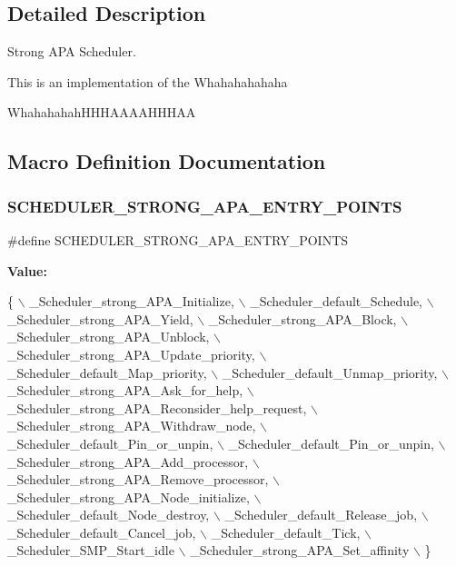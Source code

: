 \subsection{Detailed Description}
Strong A\+PA Scheduler. 

This is an implementation of the Whahahahahaha

Whahahahah\+H\+H\+H\+A\+A\+A\+A\+H\+H\+H\+AA 

\subsection{Macro Definition Documentation}
\mbox{\label{group__RTEMSScoreSchedulerStrongAPA_ga98b37281082c0be47dc489eed554c5cc}} 
\subsubsection{\texorpdfstring{S\+C\+H\+E\+D\+U\+L\+E\+R\+\_\+\+S\+T\+R\+O\+N\+G\+\_\+\+A\+P\+A\+\_\+\+E\+N\+T\+R\+Y\+\_\+\+P\+O\+I\+N\+TS}{SCHEDULER\_STRONG\_APA\_ENTRY\_POINTS}}
{\footnotesize\ttfamily \#define S\+C\+H\+E\+D\+U\+L\+E\+R\+\_\+\+S\+T\+R\+O\+N\+G\+\_\+\+A\+P\+A\+\_\+\+E\+N\+T\+R\+Y\+\_\+\+P\+O\+I\+N\+TS}

{\bfseries Value\+:}
\begin{DoxyCode}
\{ \(\backslash\)
    \_Scheduler\_strong\_APA\_Initialize, \(\backslash\)
    \_Scheduler\_default\_Schedule, \(\backslash\)
    \_Scheduler\_strong\_APA\_Yield, \(\backslash\)
    \_Scheduler\_strong\_APA\_Block, \(\backslash\)
    \_Scheduler\_strong\_APA\_Unblock, \(\backslash\)
    \_Scheduler\_strong\_APA\_Update\_priority, \(\backslash\)
    \_Scheduler\_default\_Map\_priority, \(\backslash\)
    \_Scheduler\_default\_Unmap\_priority, \(\backslash\)
    \_Scheduler\_strong\_APA\_Ask\_for\_help, \(\backslash\)
    \_Scheduler\_strong\_APA\_Reconsider\_help\_request, \(\backslash\)
    \_Scheduler\_strong\_APA\_Withdraw\_node, \(\backslash\)
    \_Scheduler\_default\_Pin\_or\_unpin, \(\backslash\)
    \_Scheduler\_default\_Pin\_or\_unpin, \(\backslash\)
    \_Scheduler\_strong\_APA\_Add\_processor, \(\backslash\)
    \_Scheduler\_strong\_APA\_Remove\_processor, \(\backslash\)
    \_Scheduler\_strong\_APA\_Node\_initialize, \(\backslash\)
    \_Scheduler\_default\_Node\_destroy, \(\backslash\)
    \_Scheduler\_default\_Release\_job, \(\backslash\)
    \_Scheduler\_default\_Cancel\_job, \(\backslash\)
    \_Scheduler\_default\_Tick, \(\backslash\)
    \_Scheduler\_SMP\_Start\_idle \(\backslash\)
    \_Scheduler\_strong\_APA\_Set\_affinity \(\backslash\)
  \}
\end{DoxyCode}


